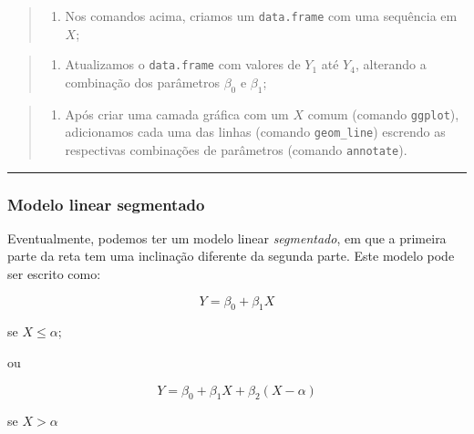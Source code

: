 \documentclass[
]{book}
\providecommand{\tightlist}{%
  \setlength{\itemsep}{0pt}\setlength{\parskip}{0pt}}
\begin{document}
\begin{quote}
\begin{enumerate}
\def\labelenumi{\arabic{enumi}.}
\tightlist
\item
  Nos comandos acima, criamos um \texttt{data.frame} com uma sequência em \(X\);
\end{enumerate}
\end{quote}

\begin{quote}
\begin{enumerate}
\def\labelenumi{\arabic{enumi}.}
\setcounter{enumi}{1}
\tightlist
\item
  Atualizamos o \texttt{data.frame} com valores de \(Y_1\) até \(Y_4\), alterando a combinação dos parâmetros \(\beta_0\) e \(\beta_1\);
\end{enumerate}
\end{quote}

\begin{quote}
\begin{enumerate}
\def\labelenumi{\arabic{enumi}.}
\setcounter{enumi}{2}
\tightlist
\item
  Após criar uma camada gráfica com um \(X\) comum (comando \texttt{ggplot}), adicionamos cada uma das linhas (comando \texttt{geom\_line}) escrendo as respectivas combinações de parâmetros (comando \texttt{annotate}).
\end{enumerate}
\end{quote}

\begin{center}\rule{0.5\linewidth}{0.5pt}\end{center}

\hypertarget{modelo-linear-segmentado}{%
\subsubsection*{Modelo linear segmentado}\label{modelo-linear-segmentado}}

Eventualmente, podemos ter um modelo linear \emph{segmentado}, em que a primeira parte da reta tem uma inclinação diferente da segunda parte. Este modelo pode ser escrito como:

\[Y = \beta_0 + \beta_1X\]

se \(X \le \alpha\);

ou

\[Y = \beta_0 + \beta_{1}X + \beta_{2}(X - \alpha)\]

se \(X > \alpha\)
\end{document}
